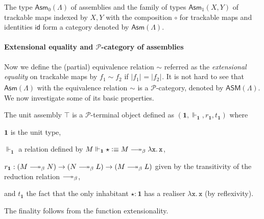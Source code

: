 \documentclass[a4paper,UKenglish,numberwithinsect,cleveref,thm-restate]{lipics-v2021}
\newcommand{\tproj}[3][]{\mathopen{}\left|#3\right|_{#2}^{#1}\mathclose{}}
\newcommand{\bproj}[1]{\tproj{}{#1}}
\newcommand{\PP}{\mathscr{P}}
\newcommand{\Asm}{\mathsf{Asm}}
\newcommand{\ASM}{\mathsf{ASM}}
\newcommand{\defeq}{\vcentcolon\equiv}
\newcommand{\id}{\mathsf{id}}
\newcommand{\Unit}{\mathbf{1}}
\DeclareRobustCommand\longtwoheadrightarrow{\relbar\joinrel\twoheadrightarrow}
\newcommand{\reduce}{\longtwoheadrightarrow_{\beta}}
\theoremstyle{plain}
\begin{document}
\begin{proposition}\label{prop:category-of-assemblies}
  The type $\Asm_0(\Lambda)$ of assemblies and the family of types $\Asm_1(X, Y)$ of trackable maps indexed by $X, Y$ with the composition $\circ$ for trackable maps and identities $\id$ form a category denoted by $\Asm(\Lambda)$.
\end{proposition}



\paragraph*{Extensional equality and \texorpdfstring{$\PP$}{P}-category of assemblies}

Now we define the (partial) equivalence relation $\sim$ referred as the \emph{extensional equality} on trackable maps by $f_1 \sim f_2$ if $\bproj{f_1} = \bproj{f_2}$.
It is not hard to see that $\Asm(\Lambda)$ with the equivalence relation $\sim$ is a $\PP$-category, denoted by $\ASM(\Lambda)$. 
We now investigate some of its basic properties.

\begin{example}
  The unit assembly $\top$ is a $\PP$-terminal object defined as $(\Unit, \Vdash_{\Unit}, r_{\Unit}, t_{\Unit})$ where 
  \begin{romanenumerate}
    \item $\Unit$ is the unit type,  
    \item $\Vdash_{\Unit}$ a relation defined by $M \Vdash_{\Unit} \star \defeq M \reduce \mathtt{\lambda x.\, x}$, 
    \item $r_{\Unit}: (M \reduce N) \to (N \reduce L) \to (M \reduce L)$ given by the transitivity of the reduction relation $\reduce$,
    \item and $t_{\Unit}$ the fact that the only inhabitant $\star : \Unit$ has a realiser $\mathtt{\lambda x.\, x}$ (by reflexivity).
  \end{romanenumerate}
  The finality follows from the function extensionality.
\end{example}
\end{document}
